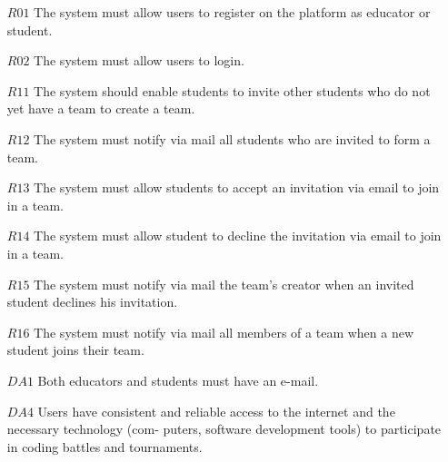 \begin{itemize}
    \item [$R01$] The system must allow users to register on the platform as educator or student.
    \item [$R02$]The system must allow users to login.
    \item [$R11$]  The system should enable students to invite other students who do not yet have a team to create a team.
    \item [$R12$]  The system must notify via mail all students who are invited to form a team.
    \item [$R13$] The system must allow students to accept an invitation via email to join in a team.
     \item [$R14$]The system must allow student to decline the invitation via email to join in a team.
     \item [$R15$]The system must notify via mail the team’s creator when an invited student declines his invitation.
     \item [$R16$] The system must notify via mail all members of a team when a new student joins their team.
    \item [$DA1$] Both educators and students must have an e-mail.
    \item [$DA4$] Users have consistent and reliable access to the internet and the necessary technology (com-
puters, software development tools) to participate in coding battles and tournaments.
   
\end{itemize}

